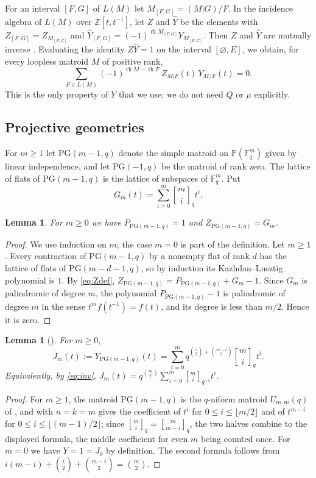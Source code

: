 \documentclass{amsart}
\newtheorem{lemma}[theorem]{Lemma}
\theoremstyle{remark}
\numberwithin{equation}{section}
\newcommand{\qbinom}[3]{\genfrac{[}{]}{0pt}{}{#1}{#2}_{#3}}
\newcommand{\F}{\mathbb{F}}
\newcommand{\PP}{\mathbb{P}}
\newcommand{\PG}{\mathrm{PG}}
\newcommand{\rk}{\operatorname{rk}}
\begin{document}
For an interval $[F,G]$ of $L(M)$ let $M_{[F,G]}=(M|G)/F$. In the incidence algebra of $L(M)$ over $\mathbb{Z}[t,t^{-1}]$, let $Z$ and $\widehat Y$ be the elements with $Z_{[F,G]}=Z_{M_{[F,G]}}$ and $\widehat Y_{[F,G]}=(-1)^{\rk M_{[F,G]}}Y_{M_{[F,G]}}$. Then $Z$ and $\widehat Y$ are mutually inverse \cite[Section~2.2]{BFMN}. Evaluating the identity $Z\widehat Y=1$ on the interval $[\varnothing,E]$, we obtain, for every loopless matroid $M$ of positive rank,
\begin{equation}\label{eq:inversion}
  \sum_{F\in L(M)}(-1)^{\rk M-\rk F}\,Z_{M|F}(t)\,Y_{M/F}(t)=0.
\end{equation}
This is the only property of $Y$ that we use; we do not need $Q$ or $\mu$ explicitly.

\subsection{Projective geometries}
For $m\ge1$ let $\PG(m-1,q)$ denote the simple matroid on $\PP(\F_q^m)$ given by linear independence, and let $\PG(-1,q)$ be the matroid of rank zero. The lattice of flats of $\PG(m-1,q)$ is the lattice of subspaces of $\F_q^m$. Put
\[
  G_m(t)=\sum_{i=0}^{m}\qbinom{m}{i}{q}t^i.
\]

\begin{lemma}\label{lem:PGPZ}
For $m\ge0$ we have $P_{\PG(m-1,q)}=1$ and $Z_{\PG(m-1,q)}=G_m$.
\end{lemma}

\begin{proof}
We use induction on $m$; the case $m=0$ is part of the definition. Let $m\ge1$. Every contraction of $\PG(m-1,q)$ by a nonempty flat of rank $d$ has the lattice of flats of $\PG(m-d-1,q)$, so by induction its Kazhdan--Lusztig polynomial is $1$. By \eqref{eq:Zdef}, $Z_{\PG(m-1,q)}=P_{\PG(m-1,q)}+G_m-1$. Since $G_m$ is palindromic of degree $m$, the polynomial $P_{\PG(m-1,q)}-1$ is palindromic of degree $m$ in the sense $t^mf(t^{-1})=f(t)$, and its degree is less than $m/2$. Hence it is zero.
\end{proof}

\begin{lemma}[{\cite[Proposition~3.8]{GLX}}]\label{lem:PG}
For $m\ge0$,
\[
  J_m(t):=Y_{\PG(m-1,q)}(t)=\sum_{i=0}^{m}q^{\binom{i}{2}+\binom{m-i}{2}}\qbinom{m}{i}{q}t^i.
\]
Equivalently, by \eqref{eq:inv}, $J_m(t)=q^{\binom m2}\sum_{i=0}^{m}\qbinom{m}{i}{q^{-1}}t^i$.
\end{lemma}

\begin{proof}
For $m\ge1$, the matroid $\PG(m-1,q)$ is the $q$-niform matroid $U_{m,m}(q)$ of \cite{GLX}, and \cite[Proposition~3.8]{GLX} with $n=k=m$ gives the coefficient of $t^i$ for $0\le i\le\lfloor m/2\rfloor$ and of $t^{m-i}$ for $0\le i\le\lfloor(m-1)/2\rfloor$; since $\qbinom{m}{i}{q}=\qbinom{m}{m-i}{q}$, the two halves combine to the displayed formula, the middle coefficient for even $m$ being counted once. For $m=0$ we have $Y=1=J_0$ by definition. The second formula follows from $i(m-i)+\binom i2+\binom{m-i}2=\binom m2$.
\end{proof}
\end{document}
